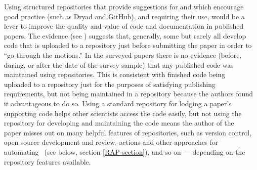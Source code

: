 \documentclass{comjnl}
\begin{document}
Using structured repositories that provide suggestions for and which encourage good practice (such as Dryad and GitHub), and requiring their use, would be a lever to improve the quality and value of code and documentation in published papers. The evidence (see \supplement) suggests that, generally, some but rarely all develop code that is uploaded to a repository just before submitting the paper in order to ``go through the motions.'' In the surveyed papers there is no evidence (before, during, or after the date of the survey sample) that any published code was maintained using repositories. This is consistent with finished code being uploaded to a repository just for the purposes of satisfying publishing requirements, but not being maintained in a repository because the authors found it advantageous to do so. Using a standard repository for lodging a paper's supporting code helps other scientists access the code easily, but not using the repository for developing and maintaining the code means the author of the paper misses out on many helpful features of repositories, such as version control, open source development and review, actions and other approaches for automating \RAPstarp\ (see below, section \ref{RAP-section}), and so on --- depending on the repository features available.
\end{document}
